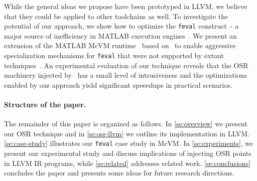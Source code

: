 
\noindent While the general ideas we propose have been prototyped in LLVM, we believe that they could be applied to other toolchains as well. To investigate the potential of our approach, we show how to optimize the {\tt feval} construct\ - a major source of inefficiency in MATLAB execution engines~\cite{lameed2013feval, radpour2013refactoring}. We present an extension of the MATLAB McVM runtime~\cite{chevalier2010mcvm} based on \osrkit\ to enable aggressive specialization mechanisms for {\tt feval} that were not supported by extant techniques~\cite{lameed2013feval}. An experimental evaluation of our technique reveals that the OSR machinery injected by \osrkit\ has a small level of intrusiveness and the optimizations enabled by our approach yield significant speeedups in practical scenarios.



\paragraph{Structure of the paper.}
The remainder of this paper is organized as follows. In \mysection\ref{se:overview} we present our OSR technique and in \mysection\ref{se:osr-llvm} we outline its implementation in LLVM. \mysection\ref{se:case-study} illustrates our {\tt feval} case study in McVM. In \mysection\ref{se:experiments}, we present our experimental study and discuss implications of injecting OSR points in LLVM IR programs, while \mysection\ref{se:related} addresses related work. \mysection\ref{se:conclusions} concludes the paper and presents some ideas for future research directions.